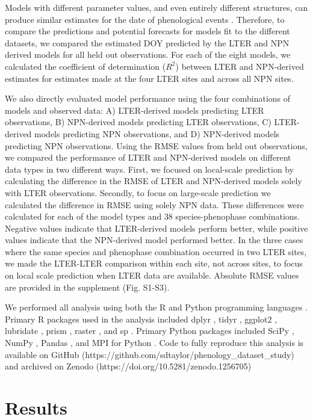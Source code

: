 \documentclass[fleqn,12pt,lineno]{article}
\begin{document}
Models with different parameter values, and even entirely different structures, can produce similar estimates for the date of phenological events \citep{basler2016}. Therefore, to compare the predictions and potential forecasts for models fit to the different datasets, we compared the estimated DOY predicted by the LTER and NPN derived models for all held out observations. For each of the eight models, we calculated the coefficient of determination ($R^2$) between LTER and NPN-derived estimates for estimates made at the four LTER sites and across all NPN sites.  

We also directly evaluated model performance using the four combinations of models and observed data: A) LTER-derived models predicting LTER observations, B) NPN-derived models predicting LTER observations, C) LTER-derived models predicting NPN observations, and D) NPN-derived models predicting NPN observations. Using the RMSE values from held out observations, we  compared the  performance of LTER and NPN-derived models on different data types in two different ways. First, we focused on local-scale prediction by calculating the difference in the RMSE of LTER and NPN-derived models solely with LTER observations. Secondly, to focus on large-scale prediction we calculated the difference in RMSE using solely NPN data. These differences were calculated for each of the model types and 38 species-phenophase combinations. Negative values indicate that LTER-derived models perform better, while positive values indicate that the NPN-derived model performed better. In the three cases where the same species and phenophase combination occurred in two LTER sites, we made the LTER-LTER comparison within each site, not across sites, to focus on local scale prediction when LTER data are available. Absolute RMSE values are provided in the supplement (Fig. S1-S3).

We performed all analysis using both the R and Python programming languages \citep{rcitation, python}. Primary R packages used in the analysis included dplyr \citep{dplyr}, tidyr \citep{tidyr}, ggplot2 \citep{ggplot2}, lubridate \citep{lubridate}, prism \citep{prismR}, raster \citep{rasterR}, and sp \citep{sp1}. Primary Python packages included SciPy \citep{scipy}, NumPy \citep{numpy}, Pandas \citep{pandas}, and MPI for Python \citep{mpi4py}. Code to fully reproduce this analysis is available on GitHub  (https://github.com/sdtaylor/phenology\_dataset\_study) and archived on Zenodo  (https://doi.org/10.5281/zenodo.1256705)

\section*{Results}
\end{document}
